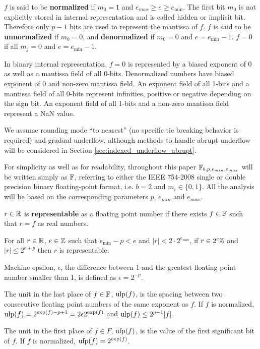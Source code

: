   $f$ is said to be \textbf{normalized} if $m_0 =1$
  and $e_{max} \geq e \geq e_{\min}$.
  The first bit $m_0$ is not explicitly stored in internal representation
  and is called hidden or implicit bit.
  Therefore only $p-1$ bits are used to represent the mantissa of $f$.
  $f$ is said to be \textbf{unnormalized} if $m_0 = 0$, and
  \textbf{denormalized} if $m_0 = 0$ and $e = e_{\min} - 1$.
  $f = 0$ if all $m_j = 0$ and $e = e_{\min} - 1$.

  In binary internal representation, $f=0$ is represented by a biased exponent of $0$
  as well as a mantissa field of all 0-bits.
  Denormalized numbers have biased exponent of $0$ and non-zero mantissa field.
  An exponent field of all 1-bits and a mantissa field of all 0-bits
  represent infinities, positive or negative depending on the sign bit.
  An exponent field of all 1-bits and a non-zero mantissa field
  represent a NaN value.

  We assume rounding mode ``to nearest'' (no specific tie
  breaking behavior is required) and gradual underflow, although
  methods to handle abrupt underflow will be considered in Section
  \ref{sec:indexed_underflow_abrupt}.

  For simplicity as well as for readability, throughout this paper
  $\mathbb{F}_{b,p,e_{min},e_{max}}$ will be written simply as $\mathbb{F}$, referring to either
  the IEEE 754-2008 single or double precision binary floating-point format,
  i.e. $b=2$ and $m_i \in \{0, 1\}$.
  All the analysis will be based on the corresponding parameters $p$, $e_{min}$
  and $e_{max}$.

  $r \in \mathbb{R}$ is \textbf{representable} as a floating point number if there
  exists $f \in \mathbb{F}$ such that $r = f$ as real numbers.

  For all $r \in \mathbb{R}$, $e \in \mathbb{Z}$ such that $e_{\min} - p < e$ and $|r| < 2
  \cdot 2^{e_{\max}}$, if $r \in 2^e\mathbb{Z}$ and $|r| \leq 2^{e + p}$ then $r$ is
  representable.

  Machine epsilon, $\epsilon$, the difference between 1 and the greatest
  floating point number smaller than 1, is defined as $\epsilon = 2^{-p}$.

  The unit in the last place of $f \in \mathbb{F}$, $\text{ulp}(f)$, is the spacing between
  two consecutive floating point numbers of the same exponent as $f$. If $f$ is
  normalized, $\text{ulp}(f) = 2^{\text{exp}(f) - p + 1} = 2  \epsilon  2^{\text{exp}(f)}$ and
  $\text{ulp}(f) \leq 2^{p - 1}|f|$.

  The unit in the first place of $f \in F$, $\text{ufp}(f)$, is the value of the
  first significant bit of $f$. If $f$ is normalized, $\text{ufp}(f) = 2^{\text{exp}(f)}$.

